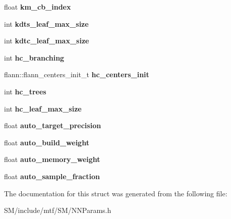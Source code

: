 \begin{DoxyCompactItemize}
\item 
\hypertarget{structmtf_1_1NNIndexParams_ab82201462e1bfe300aa74b071d1294eb}{float {\bfseries km\-\_\-cb\-\_\-index}}\label{structmtf_1_1NNIndexParams_ab82201462e1bfe300aa74b071d1294eb}

\item 
\hypertarget{structmtf_1_1NNIndexParams_a5b203e7a83500dbbc74a56d9b85617d2}{int {\bfseries kdts\-\_\-leaf\-\_\-max\-\_\-size}}\label{structmtf_1_1NNIndexParams_a5b203e7a83500dbbc74a56d9b85617d2}

\item 
\hypertarget{structmtf_1_1NNIndexParams_aa288b00bcd1292e45a48dee30c7f7a59}{int {\bfseries kdtc\-\_\-leaf\-\_\-max\-\_\-size}}\label{structmtf_1_1NNIndexParams_aa288b00bcd1292e45a48dee30c7f7a59}

\item 
\hypertarget{structmtf_1_1NNIndexParams_af780d0b46c260756d12bf42afb45d3fa}{int {\bfseries hc\-\_\-branching}}\label{structmtf_1_1NNIndexParams_af780d0b46c260756d12bf42afb45d3fa}

\item 
\hypertarget{structmtf_1_1NNIndexParams_a99ea0dedc67ebd9d6001a71ee2319c42}{flann\-::flann\-\_\-centers\-\_\-init\-\_\-t {\bfseries hc\-\_\-centers\-\_\-init}}\label{structmtf_1_1NNIndexParams_a99ea0dedc67ebd9d6001a71ee2319c42}

\item 
\hypertarget{structmtf_1_1NNIndexParams_acad92b04810c56bf80a50c4f169f3684}{int {\bfseries hc\-\_\-trees}}\label{structmtf_1_1NNIndexParams_acad92b04810c56bf80a50c4f169f3684}

\item 
\hypertarget{structmtf_1_1NNIndexParams_afdea1731aa2053b24ffb97f5e3ba1f28}{int {\bfseries hc\-\_\-leaf\-\_\-max\-\_\-size}}\label{structmtf_1_1NNIndexParams_afdea1731aa2053b24ffb97f5e3ba1f28}

\item 
\hypertarget{structmtf_1_1NNIndexParams_af449fb446d70ae55a281e869494ae5b5}{float {\bfseries auto\-\_\-target\-\_\-precision}}\label{structmtf_1_1NNIndexParams_af449fb446d70ae55a281e869494ae5b5}

\item 
\hypertarget{structmtf_1_1NNIndexParams_a4910dc97d51f3b4dae54b9f9567abb7c}{float {\bfseries auto\-\_\-build\-\_\-weight}}\label{structmtf_1_1NNIndexParams_a4910dc97d51f3b4dae54b9f9567abb7c}

\item 
\hypertarget{structmtf_1_1NNIndexParams_a2d9a92ad601d714e4ca34525aa08dc97}{float {\bfseries auto\-\_\-memory\-\_\-weight}}\label{structmtf_1_1NNIndexParams_a2d9a92ad601d714e4ca34525aa08dc97}

\item 
\hypertarget{structmtf_1_1NNIndexParams_a3406eed2c7f9280d10a63c2d6109e438}{float {\bfseries auto\-\_\-sample\-\_\-fraction}}\label{structmtf_1_1NNIndexParams_a3406eed2c7f9280d10a63c2d6109e438}

\end{DoxyCompactItemize}


The documentation for this struct was generated from the following file\-:\begin{DoxyCompactItemize}
\item 
S\-M/include/mtf/\-S\-M/N\-N\-Params.\-h\end{DoxyCompactItemize}
